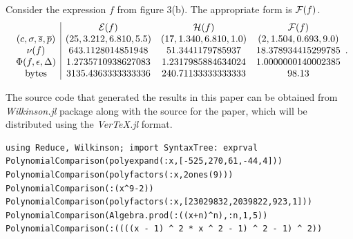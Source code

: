 \documentclass[]{elsarticle}
\begin{document}

\begin{example}
	Consider the expression $f$ from figure 3(b).
	The appropriate form is $\mathcal{F}(f)$.
	$$\begin{array}{c|cccc}
		& \mathcal{E}(f) & \mathcal{H}(f) & \mathcal{F}(f) \\
		(c,\sigma,\overline{s},\overline{p}) & (25, 3.212, 6.810, 5.5) & (17, 1.340, 6.810, 1.0) & (2, 1.504, 0.693, 9.0) \\
		\nu(f) & 643.1128014851948 & 51.3441179785937 & 18.378934415299785 \\
		\Phi(f,\epsilon,\Delta) & 1.2735710938627083 & 1.2317985884634024 & 1.0000000140002385 \\
		\text{bytes} & 3135.4363333333336 & 240.71133333333333 & 98.13
	\end{array}. $$
\end{example}

The source code that generated the results in this paper can be obtained from \textit{Wilkinson.jl} \cite{chakravala-wilkinson} package along with the source for the paper, which will be distributed using the \textit{VerTeX.jl} format.
\begin{verbatim}
using Reduce, Wilkinson; import SyntaxTree: exprval
PolynomialComparison(polyexpand(:x,[-525,270,61,-44,4]))
PolynomialComparison(polyfactors(:x,2ones(9)))
PolynomialComparison(:(x^9-2))
PolynomialComparison(polyfactors(:x,[23029832,2039822,923,1]))
PolynomialComparison(Algebra.prod(:((x+n)^n),:n,1,5))
PolynomialComparison(:((((x - 1) ^ 2 * x ^ 2 - 1) ^ 2 - 1) ^ 2))
\end{verbatim}
\end{document}
